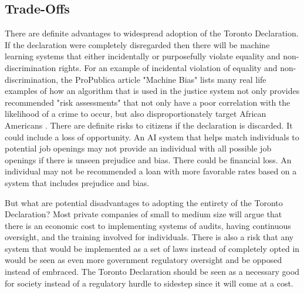 \documentclass[
	letterpaper, %
]{jdf}
\begin{document}
\subsection{Trade-Offs}
There are definite advantages to widespread adoption of the Toronto Declaration. If the declaration were completely disregarded then there will be machine learning systems that either incidentally or purposefully violate equality and non-discrimination rights. For an example of incidental violation of equality and non-discrimination, the ProPublica article "Machine Bias" lists many real life examples of how an algorithm that is used in the justice system not only provides recommended "risk assessments" that not only have a poor correlation with the likelihood of a crime to occur, but also disproportionately target African Americans \citep{Machine_Bias}. There are definite risks to citizens if the declaration is discarded. It could include a loss of opportunity. An AI system that helps match individuals to potential job openings may not provide an individual with all possible job openings if there is unseen prejudice and bias. There could be financial loss. An individual may not be recommended a loan with more favorable rates based on a system that includes prejudice and bias.


But what are potential disadvantages to adopting the entirety of the Toronto Declaration? Most private companies of small to medium size will argue that there is an economic cost to implementing systems of audits, having continuous oversight, and the training involved for individuals. There is also a risk that any system that would be implemented as a set of laws instead of completely opted in would be seen as even more government regulatory oversight and be opposed instead of embraced. The Toronto Declaration should be seen as a necessary good for society instead of a regulatory hurdle to sidestep since it will come at a cost. 
\end{document}
